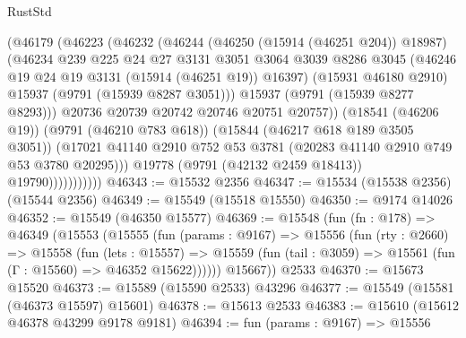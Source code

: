 \begin{lexlean}{RustStd}
\begin{coremodule}
                          (@46179
                            (@46223
                              (@46232
                                (@46244
                                  (@46250 (@15914 (@46251 @204)) @18987)
                                  (@46234
                                    @239
                                    @225
                                    @24
                                    @27
                                    @3131
                                    @3051
                                    @3064
                                    @3039
                                    @8286
                                    @3045
                                    (@46246 @19 @24 @19 @3131 (@15914 (@46251 @19)) @16397)
                                    (@15931 @46180 @2910)
                                    @15937
                                    (@9791 (@15939 @8287 @3051)))
                                  @15937
                                  (@9791 (@15939 @8277 @8293)))
                                @20736
                                @20739
                                @20742
                                @20746
                                @20751
                                @20757))
                            (@18541 (@46206 @19))
                            (@9791 (@46210 @783 @618))
                            (@15844 (@46217 @618 @189 @3505 @3051))
                            (@17021
                              @41140
                              @2910
                              @752
                              @53
                              @3781
                              (@20283 @41140 @2910 @749 @53 @3780 @20295)))
                          @19778
                          (@9791 (@42132 @2459 @18413))
                          @19790)))))))))))
@46343 := @15532 @2356
@46347 := @15534 (@15538 @2356) (@15544 @2356)
@46349 := @15549 (@15518 @15550)
@46350 := @9174 @14026
@46352 := @15549 (@46350 @15577)
@46369 := @15548
    (fun (fn : @178) =>
    @46349
      (@15553
        (@15555
          (fun (params : @9167) =>
          @15556
            (fun (rty : @2660) =>
            @15558
              (fun (lets : @15557) =>
              @15559 (fun (tail : @3059) => @15561 (fun (Γ : @15560) => @46352 @15622))))))
        @15667))
    @2533
@46370 := @15673 @15520
@46373 := @15589 (@15590 @2533) @43296
@46377 := @15549 (@15581 (@46373 @15597) @15601)
@46378 := @15613 @2533
@46383 := @15610 (@15612 @46378 @43299 @9178 @9181)
@46394 := fun (params : @9167) =>
  @15556

\end{coremodule}
\end{lexlean}

